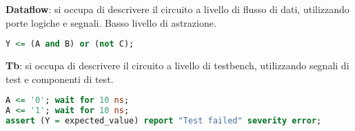             \textbf{Dataflow}: si occupa di descrivere il circuito a livello di flusso di dati, utilizzando porte logiche e segnali. Basso livello di astrazione.
            \begin{lstlisting}[language=VHDL]
Y <= (A and B) or (not C);
            \end{lstlisting}

            \textbf{Tb}: si occupa di descrivere il circuito a livello di testbench, utilizzando segnali di test e componenti di test.
            \begin{lstlisting}[language=VHDL]
A <= '0'; wait for 10 ns;
A <= '1'; wait for 10 ns;
assert (Y = expected_value) report "Test failed" severity error;
            \end{lstlisting}


